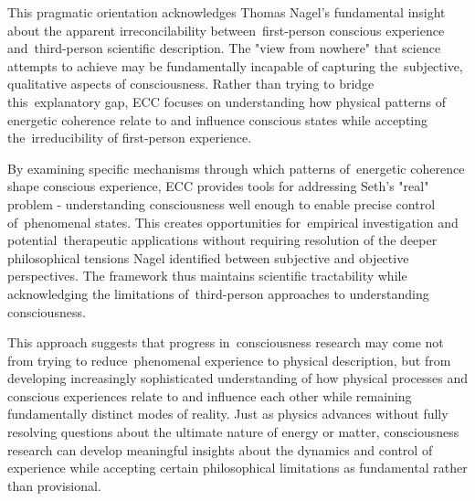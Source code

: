 This pragmatic orientation acknowledges Thomas Nagel's fundamental insight about the apparent irreconcilability between~first-person conscious experience and~third-person scientific description. The "view from nowhere" that science attempts to achieve may be fundamentally incapable of capturing the~subjective, qualitative aspects of consciousness. Rather than trying to bridge this~explanatory gap, ECC focuses on understanding how physical patterns of energetic coherence relate to and influence conscious states while accepting the~irreducibility of first-person experience.

By examining specific mechanisms through which patterns of~energetic coherence shape conscious experience, ECC provides tools for addressing Seth's "real" problem - understanding consciousness well enough to enable precise control of~phenomenal states. This creates opportunities for~empirical investigation and potential~therapeutic applications without requiring resolution of the deeper philosophical tensions Nagel identified between subjective and objective perspectives. The framework thus maintains scientific tractability while acknowledging the limitations of~third-person approaches to understanding consciousness.

This approach suggests that progress in~consciousness research may come not from trying to reduce~phenomenal experience to physical description, but from developing increasingly sophisticated understanding of how physical processes and conscious experiences relate to and influence each other while remaining fundamentally distinct modes of reality. Just as physics advances without fully resolving questions about the ultimate nature of energy or matter, consciousness research can develop meaningful insights about the dynamics and control of experience while accepting certain philosophical limitations as fundamental rather than provisional.

